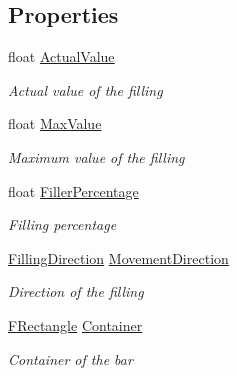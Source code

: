 \subsection*{Properties}
\begin{DoxyCompactItemize}
\item 
float \hyperlink{class_hel_project_1_1_u_i_1_1_h_u_d_1_1_filling_bar_a0b40c0a57e415afa6a4aea24cf1114ed}{Actual\+Value}
\begin{DoxyCompactList}\small\item\em Actual value of the filling \end{DoxyCompactList}\item 
float \hyperlink{class_hel_project_1_1_u_i_1_1_h_u_d_1_1_filling_bar_a40b9eda50476a7b3e82084f500c704c7}{Max\+Value}
\begin{DoxyCompactList}\small\item\em Maximum value of the filling \end{DoxyCompactList}\item 
float \hyperlink{class_hel_project_1_1_u_i_1_1_h_u_d_1_1_filling_bar_a2108e1a6e7db2b7be67e30ac313e2699}{Filler\+Percentage}
\begin{DoxyCompactList}\small\item\em Filling percentage \end{DoxyCompactList}\item 
\hyperlink{class_hel_project_1_1_u_i_1_1_h_u_d_1_1_filling_bar_a2f19768a47999784b10d84eabca4c86e}{Filling\+Direction} \hyperlink{class_hel_project_1_1_u_i_1_1_h_u_d_1_1_filling_bar_ab404ab107fd3d2dde3cfde5ae09b1b81}{Movement\+Direction}
\begin{DoxyCompactList}\small\item\em Direction of the filling \end{DoxyCompactList}\item 
\hyperlink{class_hel_project_1_1_tools_1_1_f_rectangle}{F\+Rectangle} \hyperlink{class_hel_project_1_1_u_i_1_1_h_u_d_1_1_filling_bar_a95e46b103b01ada7e2653acd84ee1640}{Container}
\begin{DoxyCompactList}\small\item\em Container of the bar \end{DoxyCompactList}\item 

\end{DoxyCompactItemize}
